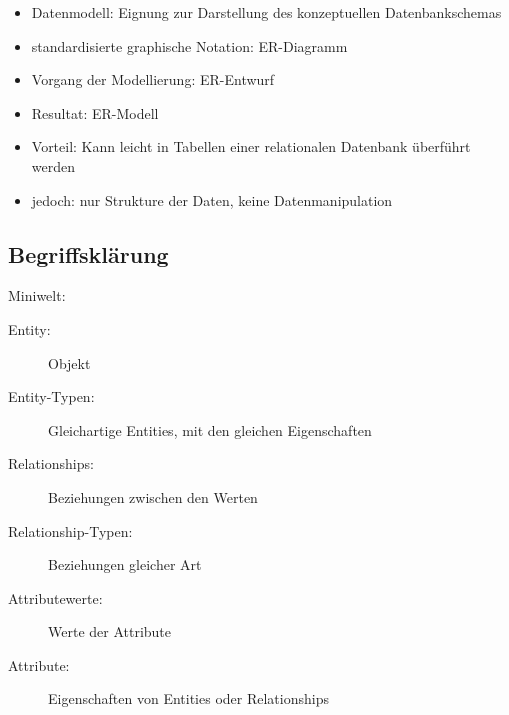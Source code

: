 \documentclass{bschlangaul-theorie}
\begin{document}
\begin{itemize}
\item Datenmodell: Eignung zur Darstellung des konzeptuellen
Datenbankschemas
\item standardisierte graphische Notation: ER-Diagramm
\item Vorgang der Modellierung: ER-Entwurf
\item Resultat: ER-Modell
\item Vorteil: Kann leicht in Tabellen einer relationalen Datenbank
überführt werden
\item jedoch: nur Strukture der Daten, keine Datenmanipulation
\end{itemize}

\subsection{Begriffsklärung}

Miniwelt:

\begin{description}
\item[Entity:] Objekt

\item[Entity-Typen:] Gleichartige Entities, mit den gleichen
Eigenschaften


\item[Relationships:] Beziehungen zwischen den Werten

\item[Relationship-Typen:] Beziehungen gleicher Art


\item[Attributewerte:] Werte der Attribute

\item[Attribute:] Eigenschaften von Entities oder Relationships

\end{description}
\end{document}
